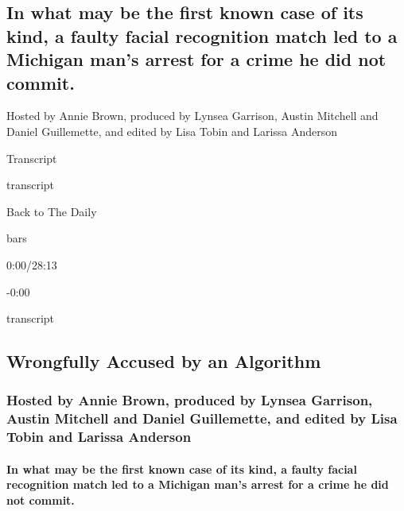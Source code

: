 \hypertarget{in-what-may-be-the-first-known-case-of-its-kind-a-faulty-facial-recognition-match-led-to-a-michigan-mans-arrest-for-a-crime-he-did-not-commit-1}{%
\subsection{In what may be the first known case of its kind, a faulty
facial recognition match led to a Michigan man's arrest for a crime he
did not
commit.}\label{in-what-may-be-the-first-known-case-of-its-kind-a-faulty-facial-recognition-match-led-to-a-michigan-mans-arrest-for-a-crime-he-did-not-commit-1}}

Hosted by Annie Brown, produced by Lynsea Garrison, Austin Mitchell and
Daniel Guillemette, and edited by Lisa Tobin and Larissa Anderson

Transcript

transcript

Back to The Daily

bars

0:00/28:13

-0:00

transcript

\hypertarget{wrongfully-accused-by-an-algorithm-2}{%
\subsection{Wrongfully Accused by an
Algorithm}\label{wrongfully-accused-by-an-algorithm-2}}

\hypertarget{hosted-by-annie-brown-produced-by-lynsea-garrison-austin-mitchell-and-daniel-guillemette-and-edited-by-lisa-tobin-and-larissa-anderson-1}{%
\subsubsection{Hosted by Annie Brown, produced by Lynsea Garrison,
Austin Mitchell and Daniel Guillemette, and edited by Lisa Tobin and
Larissa
Anderson}\label{hosted-by-annie-brown-produced-by-lynsea-garrison-austin-mitchell-and-daniel-guillemette-and-edited-by-lisa-tobin-and-larissa-anderson-1}}

\hypertarget{in-what-may-be-the-first-known-case-of-its-kind-a-faulty-facial-recognition-match-led-to-a-michigan-mans-arrest-for-a-crime-he-did-not-commit-2}{%
\paragraph{In what may be the first known case of its kind, a faulty
facial recognition match led to a Michigan man's arrest for a crime he
did not
commit.}\label{in-what-may-be-the-first-known-case-of-its-kind-a-faulty-facial-recognition-match-led-to-a-michigan-mans-arrest-for-a-crime-he-did-not-commit-2}}

